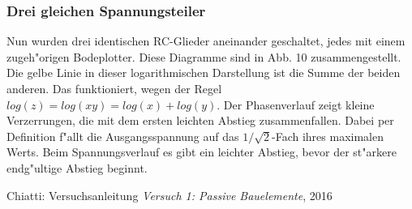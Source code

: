 \documentclass[10pt]{article}
\begin{document}
\subsubsection{Drei gleichen Spannungsteiler}
Nun wurden drei identischen RC-Glieder aneinander geschaltet, jedes mit einem zugeh"origen Bodeplotter. Diese Diagramme sind in Abb. 10 zusammengestellt. Die gelbe Linie in dieser logarithmischen Darstellung ist die Summe der beiden anderen. Das funktioniert, wegen der Regel $log(z)=log(xy)=log(x)+log(y)$. Der Phasenverlauf zeigt kleine Verzerrungen, die mit dem ersten leichten Abstieg zusammenfallen. Dabei per Definition f"allt die Ausgangsspannung auf das $1/\sqrt{2}$-Fach ihres maximalen Werts. Beim Spannungsverlauf es gibt ein leichter Abstieg, bevor der st"arkere endg"ultige Abstieg beginnt.






\begin{thebibliography}{4}
 Chiatti: Versuchsanleitung \textit{Versuch 1: Passive Bauelemente}, 2016

\end{thebibliography}


\begin{appendix}

\end{appendix}
\end{document}
